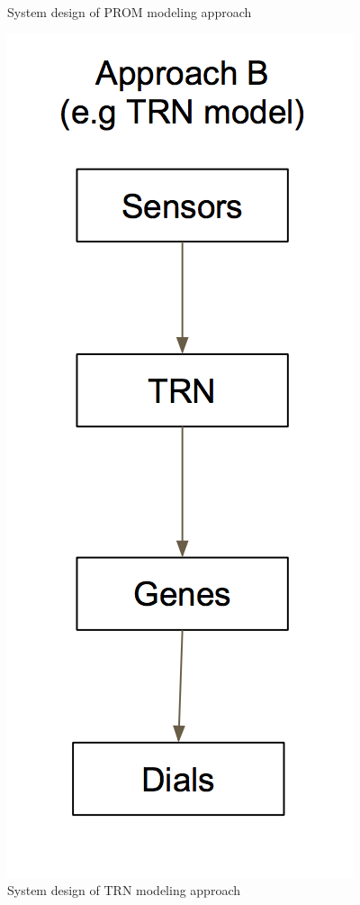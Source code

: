 \documentclass[12pt,chapterheads]{ucsd}
\begin{document}
\begin{figure}[!tbp]
\begin{minipage}[b]{0.4\textwidth}
    \caption[System design PROM modeling approach]{System design of PROM modeling approach}
    \label{fig:prom}
  \end{minipage}
  \hfill
  \begin{minipage}[b]{0.4\textwidth}
    \includegraphics[width=\textwidth]{TRN}
    \caption[System design of TRN modeling approach]{System design of TRN modeling approach}
\label{fig:trn}
  \end{minipage}
\end{figure}
\end{document}
